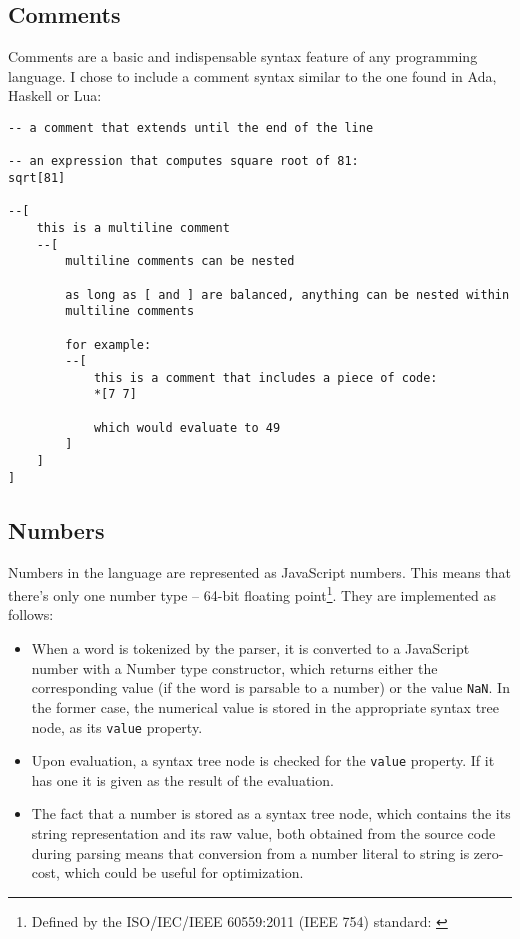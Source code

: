 \subsection{Comments}\label{sub:comments}
Comments are a basic and indispensable syntax feature of any programming language. I chose to include a comment syntax similar to the one found in Ada, Haskell or Lua:
\begin{lstlisting}
-- a comment that extends until the end of the line

-- an expression that computes square root of 81:
sqrt[81]

--[
    this is a multiline comment
    --[
        multiline comments can be nested
        
        as long as [ and ] are balanced, anything can be nested within
        multiline comments
        
        for example:
        --[
            this is a comment that includes a piece of code:
            *[7 7]
            
            which would evaluate to 49
        ]
    ]
]
\end{lstlisting}

\subsection{Numbers}
Numbers in the language are represented as JavaScript numbers. This means that
there's only one number type -- 64-bit floating point\footnote{Defined by the
  ISO/IEC/IEEE 60559:2011 (IEEE 754) standard:
  \cite{60559_2011, js_numbers}}. They are implemented as follows:
\begin{itemize}
    \item When a word is tokenized by the parser, it is converted to a
      JavaScript number with a Number type constructor, which returns either the
      corresponding value (if the word is parsable to a number) or the value
      \texttt{NaN}. In the former case, the numerical value is stored in the
      appropriate syntax tree node, as its \texttt{value} property.
    \item Upon evaluation, a syntax tree node is checked for the \texttt{value}
      property. If it has one it is given as the result of the evaluation.
    \item The fact that a number is stored as a syntax tree node, which contains
      the its string representation and its raw value, both obtained from the
      source code during parsing means that conversion from a number literal to
      string is zero-cost, which could be useful for optimization.
\end{itemize}

